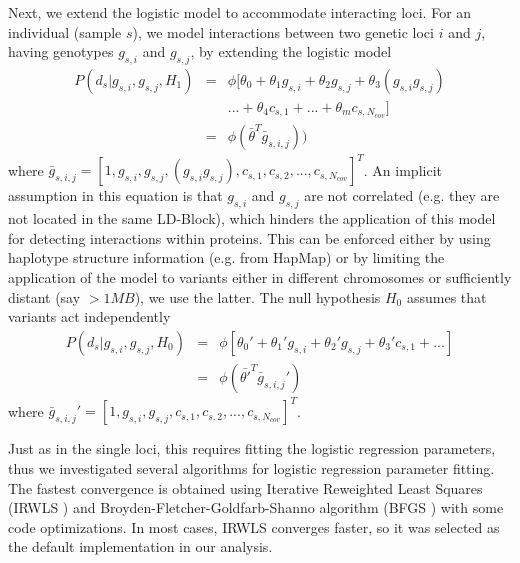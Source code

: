 Next, we extend the logistic model to accommodate interacting loci. For an individual (sample $s$), we model interactions between two genetic loci $i$ and $j$, having genotypes $g_{s,i}$ and $g_{s,j}$, by extending the logistic model
\begin{eqnarray} \label{eq:gwasLogRegH1}
    P( d_s | g_{s,i},g_{s,j}, H_1) & = & \phi[ \theta_0 + \theta_1 g_{s,i} + \theta_2 g_{s,j} + \theta_3 (g_{s,i} g_{s,j}) \\
    & & ... + \theta_4 c_{s,1} + ... + \theta_m c_{s,N_{cov}} ] \\
    & = & \phi( \bar{\theta}^T \bar{g}_{s,i,j}) )
\end{eqnarray}
\noindent where $\bar{g}_{s,i,j} =  [1, g_{s,i}, g_{s,j}, ( g_{s,i} g_{s,j}), c_{s,1}, c_{s,2}, ..., c_{s,N_{cov}} ]^T$. 
An implicit assumption in this equation is that $g_{s,i}$ and $g_{s,j}$ are not correlated (e.g. they are not located in the same LD-Block), which hinders the application of this model for detecting interactions within proteins.
This can be enforced either by using haplotype structure information (e.g. from HapMap) or by limiting the application of the model to variants either in different chromosomes or sufficiently distant (say $> 1MB$), we use the latter.
The null hypothesis $H_0$ assumes that variants act independently
\begin{eqnarray} \label{eq:gwasLogRegH0}
    P( d_s | g_{s,i},g_{s,j}, H_0) & = & \phi[ \theta_0' + \theta_1' g_{s,i} + \theta_2' g_{s,j} + \theta_3' c_{s,1} + ... ] \\
   & = & \phi( \bar{\theta'}^T \bar{g}_{s,i,j}' )
\end{eqnarray}
\noindent where $\bar{g}_{s,i,j}' =  [1, g_{s,i}, g_{s,j}, c_{s,1} , c_{s,2}, ..., c_{s,N_{cov}} ]^T$.

Just as in the single loci, this requires fitting the logistic regression parameters, thus we investigated several algorithms for logistic regression parameter fitting. 
The fastest convergence is obtained using Iterative Reweighted Least Squares (IRWLS \cite{daubechies2010iteratively}) and Broyden-Fletcher-Goldfarb-Shanno algorithm (BFGS \cite{broyden1970convergence}) with some code optimizations. In most cases, IRWLS converges faster, so it was selected as the default implementation in our analysis.

